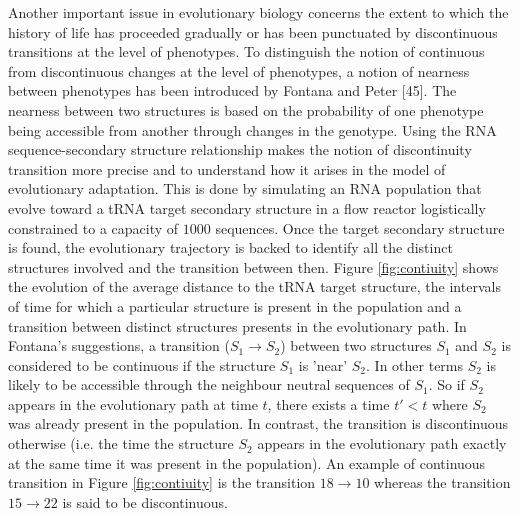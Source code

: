 Another important issue in evolutionary biology concerns the extent to which the history of life has proceeded gradually or has been punctuated by discontinuous transitions at the level of phenotypes. To distinguish the notion of continuous from discontinuous changes at the level of phenotypes, a notion of nearness between phenotypes has been introduced by Fontana and Peter [45]. The nearness between two structures is based on the probability of one phenotype being accessible from another through changes in the genotype.  Using the RNA sequence-secondary structure relationship makes the notion of discontinuity transition more precise and to understand how it arises in the model of evolutionary adaptation. This is done by simulating an RNA population that evolve toward a tRNA target secondary structure in a flow reactor logistically constrained to a capacity of $1000$ sequences. Once the target secondary structure is found, the evolutionary trajectory is backed to identify all the distinct structures involved and the transition between then. Figure \ref{fig:contiuity} shows the evolution of the average distance to the tRNA target structure, the intervals of time for which a particular structure is present in the population and a transition between distinct structures presents in the evolutionary path. In Fontana's suggestions, a transition ($S_1 \rightarrow S_2$) between two structures $S_1$ and $S_2$ is considered to be continuous if the structure $S_1$ is 'near' $S_2$. In other terms $S_2$ is likely to be accessible through the neighbour neutral sequences of $S_1$. So if $S_2$ appears in the evolutionary path at time $t$, there exists a time $t'<t$ where $S_2$ was already present in the population. In contrast, the transition is discontinuous otherwise (i.e. the time the structure $S_2$ appears in the evolutionary path exactly at the same time it was present in the population).  An example of continuous transition in Figure \ref{fig:contiuity} is the transition  $18 \rightarrow 10$ whereas the transition $15 \rightarrow 22$ is said to be discontinuous. 

